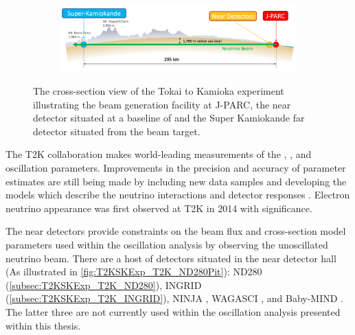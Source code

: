 \begin{figure}[h]
  \begin{subfigure}[t]{0.95\textwidth}
    \includegraphics[width=\textwidth, trim={0mm 0mm 0mm 0mm}, clip,page=1]{Figures/Detectors/T2KCrossSection.pdf}
  \end{subfigure}
  \caption{The cross-section view of the Tokai to Kamioka experiment illustrating the beam generation facility at J-PARC, the near detector situated at a baseline of  and the Super Kamiokande far detector situated  from the beam target.}
  \label{fig:T2KSKExp_T2K_Overview}
\end{figure}

The T2K collaboration makes world-leading measurements of the \sinsqatm, \delmsqatm, and \dcp oscillation parameters. Improvements in the precision and accuracy of parameter estimates are still being made by including new data samples and developing the models which describe the neutrino interactions and detector responses \cite{Bronner2022-wd}. Electron neutrino appearance was first observed at T2K in 2014 \cite{2014_Abe_ElectronNuApp} with \quickmath{7.3\sigma} significance.

The near detectors provide constraints on the beam flux and cross-section model parameters used within the oscillation analysis by observing the unoscillated neutrino beam. There are a host of detectors situated in the near detector hall (As illustrated in \autoref{fig:T2KSKExp_T2K_ND280Pit}): ND280 (\autoref{subsec:T2KSKExp_T2K_ND280}), INGRID (\autoref{subsec:T2KSKExp_T2K_INGRID}), NINJA \cite{ninja}, WAGASCI \cite{wagasci}, and Baby-MIND \cite{baby_mind}. The latter three are not currently used within the oscillation analysis presented within this thesis.

